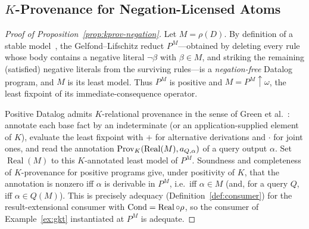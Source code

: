 \subsection{$K$-Provenance for Negation-Licensed Atoms}

\begin{proof}[Proof of Proposition~\ref{prop:kprov-negation}]
  Let $M = \rho(D)$. By definition of a stable
  model~\cite{gelfond1988stable}, the Gelfond--Lifschitz reduct $P^{M}$---obtained
  by deleting every rule whose body contains a negative literal $\neg\beta$ with
  $\beta \in M$, and striking the remaining (satisfied) negative literals from
  the surviving rules---is a \emph{negation-free} Datalog program, and $M$ is
  its least model. Thus $P^{M}$ is positive and $M = P^{M}{\uparrow}\omega$, the
  least fixpoint of its immediate-consequence operator.

  Positive Datalog admits $K$-relational provenance in the sense of Green et
  al.~\cite{green2007provenance}: annotate each base fact by an indeterminate
  (or an application-supplied element of $K$), evaluate the least fixpoint with
  $+$ for alternative derivations and $\cdot$ for joint ones, and read the
  annotation $\operatorname{Prov}_K(\operatorname{Real}(M), a_{Q,\alpha})$ of a query output
  $\alpha$. Set $\operatorname{Real}(M)$ to this $K$-annotated least model of
  $P^{M}$. Soundness and completeness of $K$-provenance for positive programs
  give, under positivity of $K$, that the annotation is nonzero iff $\alpha$ is
  derivable in $P^{M}$, i.e.\ iff $\alpha \in M$ (and, for a query $Q$, iff
  $\alpha \in Q(M)$). This is precisely adequacy
  (Definition~\ref{def:consumer}) for the result-extensional consumer with
  $\operatorname{Cond} = \operatorname{Real}\circ\rho$, so the consumer of
  Example~\ref{ex:gkt} instantiated at $P^{M}$ is adequate.


\end{proof}
